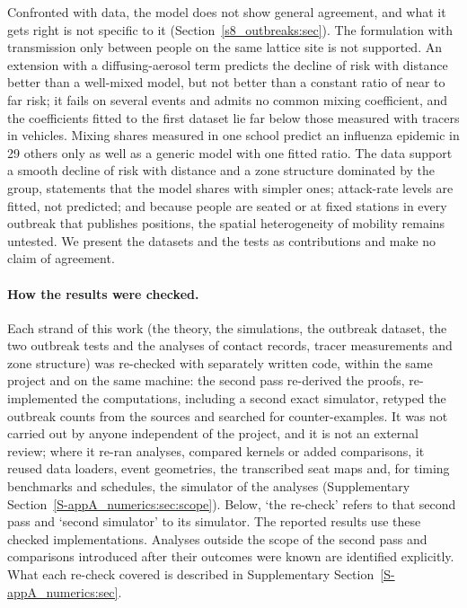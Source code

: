 Confronted with data, the model does not show general agreement, and what it gets right is not specific to
it (Section~\ref{s8_outbreaks:sec}). The formulation with transmission only between people on the same
lattice site is not supported. An extension with a diffusing-aerosol term predicts the decline of risk with
distance better than a well-mixed model, but not better than a constant ratio of near to far risk; it fails
on several events and admits no common mixing coefficient, and the coefficients fitted to the first dataset lie
far below those measured with tracers in vehicles. Mixing shares measured in one school predict an influenza epidemic in 29 others only as well as a generic model with
one fitted ratio. The data support a smooth decline of risk with distance and a zone structure dominated by
the group, statements that the model shares with simpler ones; attack-rate levels are fitted, not predicted;
and because people are seated or at fixed stations in every outbreak that publishes positions, the spatial
heterogeneity of mobility remains untested. We present the datasets and the tests as contributions and make
no claim of agreement.

\paragraph{How the results were checked.}
Each strand of this work (the theory, the simulations, the outbreak dataset, the two outbreak tests and the
analyses of contact records, tracer measurements and zone structure) was re-checked with separately written
code, within the same project and on the same machine: the second pass re-derived the proofs, re-implemented
the computations, including a second exact simulator, retyped the outbreak counts from the sources and
searched for counter-examples. It was not carried out by anyone independent of the project, and it is not an
external review; where it re-ran analyses, compared kernels or added comparisons, it reused data loaders, event
geometries, the transcribed seat maps and, for timing benchmarks and schedules, the simulator of the analyses
(Supplementary Section~\ref{S-appA_numerics:sec:scope}). Below, `the re-check' refers to that second pass and `second simulator' to its simulator.
The reported results use these checked implementations. Analyses outside the scope of the second pass
and comparisons introduced after their outcomes were known are identified explicitly. What each
re-check covered is described in Supplementary Section~\ref{S-appA_numerics:sec}.

